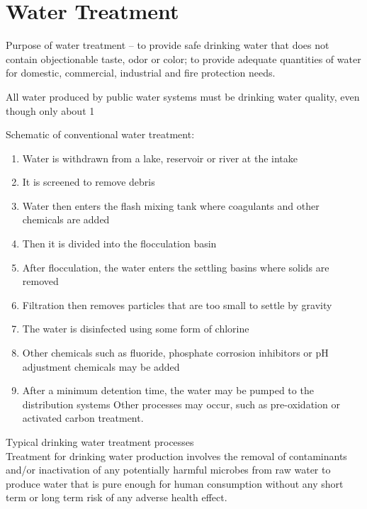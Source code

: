 \chapter{Water Treatment}
Purpose of water treatment – to provide safe drinking water that does not contain objectionable taste, odor or color; to provide adequate quantities of water for domestic, commercial, industrial and fire protection needs.

All water produced by public water systems must be drinking water quality, even though only about 1%

Schematic of conventional water treatment:
\begin{enumerate}
\item Water is withdrawn from a lake, reservoir or river at the intake
\item It is screened to remove debris
\item Water then enters the flash mixing tank where coagulants and other chemicals are added
\item Then it is divided into the flocculation basin
\item After flocculation, the water enters the settling basins where solids are removed
\item Filtration then removes particles that are too small to settle by gravity
\item The water is disinfected using some form of chlorine
\item Other chemicals such as fluoride, phosphate corrosion inhibitors or pH adjustment chemicals may be added
\item After a minimum detention time, the water may be pumped to the distribution systems Other processes may occur, such as pre-oxidation or activated carbon treatment.
\end{enumerate}



Typical drinking water treatment processes\\
Treatment for drinking water production involves the removal of contaminants and/or inactivation of any potentially harmful microbes from raw water to produce water that is pure enough for human consumption without any short term or long term risk of any adverse health effect.\\

